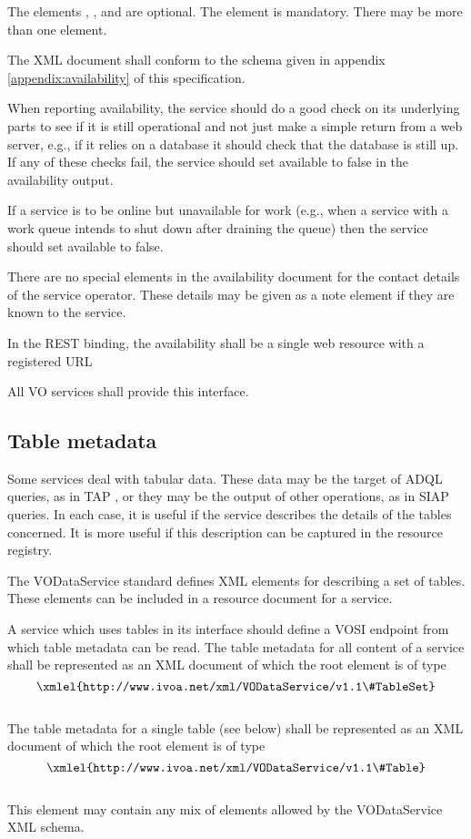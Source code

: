\documentclass[11pt,letter]{ivoa}
\begin{document}
The elements , ,  and
 are optional. The  element is mandatory.
There may be more than one  element.

The XML document shall conform to the schema given in appendix
\ref{appendix:availability} of this specification.

When reporting availability, the service should do a good check on its
underlying parts to see if it is still operational and not just make a
simple return from a web server, e.g., if it relies on a database it
should check that the database is still up. If any of these checks fail,
the service should set available to false in the availability output.

If a service is to be online but unavailable for work (e.g., when a
service with a work queue intends to shut down after draining the queue)
then the service should set available to false.

There are no special elements in the availability document for the
contact details of the service operator. These details may be given as a
note element if they are known to the service.

In the REST binding, the availability shall be a single web resource
with a registered URL

All VO services shall provide this interface. 

\subsection{Table metadata}

 Some services deal with tabular data. These data may be the target of
 ADQL queries, as in TAP \citep{2017ivoa.spec.0509L}, or they may be the
 output of other operations, as in SIAP queries. In each case, it is
 useful if the service describes the details of the tables concerned. It
 is more useful if this description can be captured in the resource
 registry.

The VODataService standard \citep{2021ivoa.spec.1102D} defines XML
elements for describing a set of tables. These elements can be included
in a resource document for a service.

A service which uses tables in its interface should define a VOSI
endpoint from which table metadata can be read. The table metadata for
all content of a service shall be represented as an XML document of
which the root element is of type\\
$$\hbox{\xmlel{http://www.ivoa.net/xml/VODataService/v1.1\#TableSet}}$$\\
The table metadata for a single table (see below) shall be represented as an
XML document of which the root element is of type\\
$$\hbox{\xmlel{http://www.ivoa.net/xml/VODataService/v1.1\#Table}}$$\\
This element may contain any mix of elements allowed by the VODataService XML schema.
\end{document}
